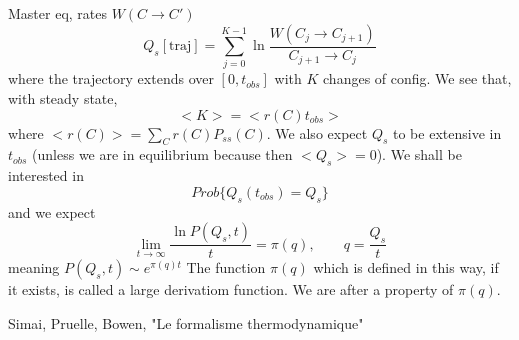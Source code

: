 \documentclass[a4paper]{book}
\theoremstyle{definition}
\theoremstyle{remark}
\begin{document}
Master eq, rates $W(C \rightarrow C')$
\begin{equation}
    Q_s [\text{traj}] = \sum_{j=0}^{K-1} \ln \frac{W(C_j \rightarrow C_{j+1})}{C_{j+1} \rightarrow C_j}
\end{equation}
where the trajectory extends over $[0, t_{obs}]$ with $K$ changes of config. We see that, with steady state, 
\begin{equation}
    <K> = <r(C)t_{obs}>
\end{equation}
where $<r(C)> = \sum_C r(C) P_{ss}(C)$. We also expect $Q_s$ to be extensive in $t_{obs}$ (unless we are in equilibrium because then $<Q_s> = 0$). We shall be interested in 
\begin{equation}
    Prob \{Q_s(t_{obs}) = Q_s\}
\end{equation}
and we expect 
\begin{equation}
    \lim_{t \rightarrow \infty} \frac{\ln P(Q_s, t)}{t} = \pi(q), \qquad q = \frac{Q_s}{t}
\end{equation}
meaning $P(Q_s, t) \sim e^{\pi(q)t}$
The function $\pi(q)$ which is defined in this way, if it exists, is called a large derivatiom function. We are after a property of $\pi(q)$. \par \medskip 

Simai, Pruelle, Bowen, "Le formalisme thermodynamique" \par \medskip 
\end{document}
